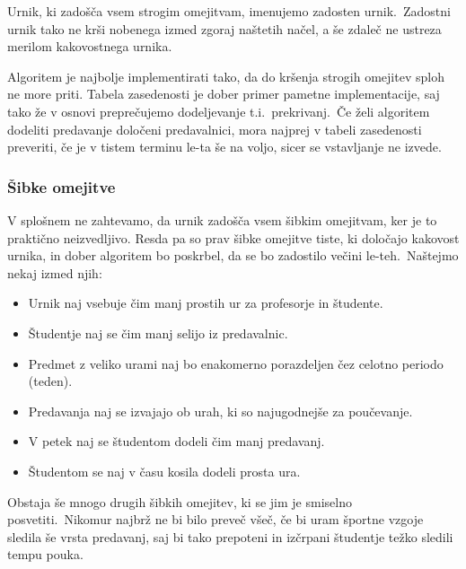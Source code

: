 \documentclass[a4paper]{article}
\begin{document}
\noindent Urnik, ki zadošča vsem strogim omejitvam, imenujemo zadosten urnik.\ Zadostni urnik tako ne
krši nobenega izmed zgoraj naštetih načel, a še zdaleč ne ustreza merilom kakovostnega urnika.

Algoritem je najbolje implementirati tako, da do kršenja strogih omejitev sploh ne more priti.
Tabela zasedenosti je dober primer pametne implementacije, saj tako že v osnovi  preprečujemo
dodeljevanje t.i.\ prekrivanj.\ Če želi algoritem dodeliti predavanje določeni predavalnici,
mora najprej v tabeli zasedenosti preveriti, če je v tistem terminu le-ta še na voljo,
sicer se vstavljanje ne izvede.

\subsubsection{Šibke omejitve} %

V splošnem ne zahtevamo, da urnik zadošča vsem šibkim omejitvam, ker je to praktično neizvedljivo.
Resda pa so prav šibke omejitve tiste, ki določajo kakovost urnika, in dober algoritem bo
poskrbel, da se bo zadostilo večini le-teh.\ Naštejmo nekaj izmed njih:


\begin{itemize}
	\item Urnik naj vsebuje čim manj prostih ur za profesorje in študente.
   \item Študentje naj se čim manj selijo iz predavalnic.
   \item Predmet z veliko urami naj bo enakomerno porazdeljen čez celotno periodo (teden).
   \item Predavanja naj se izvajajo ob urah, ki so najugodnejše za poučevanje.
   \item V petek naj se študentom dodeli čim manj predavanj.
   \item Študentom se naj v času kosila dodeli prosta ura.
\end{itemize}

\noindent Obstaja še mnogo drugih šibkih omejitev, ki se jim je smiselno posvetiti.\ Nikomur najbrž ne
bi bilo preveč všeč, če bi uram športne vzgoje sledila še vrsta predavanj, saj bi tako
prepoteni in izčrpani študentje težko sledili tempu pouka.
\end{document}
